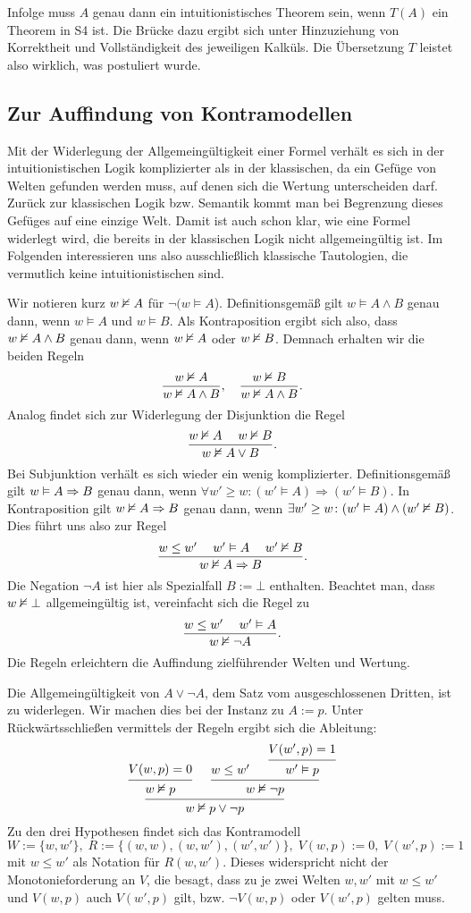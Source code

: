 \noindent
Infolge muss $A$ genau dann ein intuitionistisches Theorem sein,
wenn $T(A)$ ein Theorem in S4 ist. Die Brücke dazu ergibt sich
unter Hinzuziehung von Korrektheit und Vollständigkeit des jeweiligen
Kalküls. Die Übersetzung $T$ leistet also wirklich, was postuliert
wurde.

\subsection{Zur Auffindung von Kontramodellen}

Mit der Widerlegung der Allgemeingültigkeit einer Formel verhält es sich
in der intuitionistischen Logik komplizierter als in der klassischen,
da ein Gefüge von Welten gefunden werden muss, auf denen sich die
Wertung unterscheiden darf. Zurück zur klassischen Logik bzw. Semantik
kommt man bei Begrenzung dieses Gefüges auf eine einzige Welt.
Damit ist auch schon klar, wie eine Formel widerlegt wird, die bereits
in der klassischen Logik nicht allgemeingültig ist. Im Folgenden
interessieren uns also ausschließlich klassische Tautologien, die
vermutlich keine intuitionistischen sind.

Wir notieren kurz $w\nvDash A$ für $\lnot (w\models A$).
Definitionsgemäß gilt $w\models A\land B$ genau dann, wenn
$w\models A$ und $w\models B$. Als Kontraposition ergibt sich also,
dass $w\nvDash A\land B$ genau dann, wenn $w\nvDash A$ oder
$w\nvDash B$. Demnach erhalten wir die beiden Regeln
\[\dfrac{w\nvDash A}{w\nvDash A\land B},\quad \dfrac{w\nvDash B}{w\nvDash A\land B}.\]
Analog findet sich zur Widerlegung der Disjunktion die Regel
\[\dfrac{w\nvDash A\quad\; w\nvDash B}{w\nvDash A\lor B}.\]
Bei Subjunktion verhält es sich wieder ein wenig komplizierter.
Definitionsgemäß gilt $w\vDash A\Rightarrow B$ genau dann, wenn
$\forall w'\ge w\colon (w'\models A)\Rightarrow (w'\models B)$. In
Kontraposition gilt $w\nvDash A\Rightarrow B$ genau dann,
wenn $\exists w'\ge w\colon (w'\vDash A)\land (w'\nvDash B)$. Dies
führt uns also zur Regel
\[\frac{w\le w'\quad\; w'\vDash A\quad\; w'\nvDash B}{w\nvDash A\Rightarrow B}.\]
Die Negation $\lnot A$ ist hier als Spezialfall $B:=\bot$ enthalten.
Beachtet man, dass $w\nvDash\bot$ allgemeingültig ist, vereinfacht sich
die Regel zu
\[\frac{w\le w'\quad\; w'\vDash A}{w\nvDash\lnot A}.\]
Die Regeln erleichtern die Auffindung zielführender Welten und
Wertung.

 Die Allgemeingültigkeit von $A\lor\lnot A$, dem
Satz vom ausgeschlossenen Dritten, ist zu widerlegen. Wir machen dies
bei der Instanz zu $A:=p$. Unter Rückwärtsschließen vermittels der Regeln
ergibt sich die Ableitung:
\[\begin{prooftree}
    \hypo{V(w,p)=0}
  \infer1{w\refutes p}
    \hypo{w\le w'}
      \hypo{V(w',p)=1}
    \infer1{w'\models p}
  \infer2{w\refutes\lnot p}
\infer2{w\refutes p\lor\lnot p}
\end{prooftree}\]
Zu den drei Hypothesen findet sich das Kontramodell
\[W:=\{w,w'\},\;R := \{(w,w),(w,w'),(w',w')\},\;V(w,p):=0,\;V(w',p):=1\]
mit $w\le w'$ als Notation für $R(w,w')$. Dieses widerspricht nicht der
Monotonieforderung an $V$, die besagt, dass zu je zwei Welten $w,w'$
mit $w\le w'$ und $V(w,p)$ auch $V(w',p)$ gilt, bzw. $\lnot V(w,p)$
oder $V(w',p)$ gelten muss.


